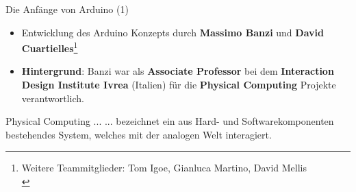 \documentclass{beamer}
\begin{document}
\begin{frame}{Die Anf\"ange von Arduino (1)}
\begin{itemize}
	 \item Entwicklung des Arduino Konzepts durch \textbf{Massimo Banzi} und \textbf{David Cuartielles}\footnote{Weitere Teammitglieder: Tom Igoe, Gianluca Martino, David Mellis\cite{IEEE:2016:TheMakingOfArduino}\\}
\end{itemize}
\begin{itemize}
	\item \textbf{Hintergrund}: Banzi war als \textbf{Associate Professor} bei dem \textbf{Interaction Design Institute Ivrea} (Italien) f\"ur die \textbf{Physical Computing} Projekte verantwortlich.
\end{itemize}
\begin{alertblock}{Physical Computing ...}
	... bezeichnet ein aus Hard- und Softwarekomponenten bestehendes System, welches mit der analogen Welt interagiert.
\end{alertblock}
\end{frame}
\end{document}
